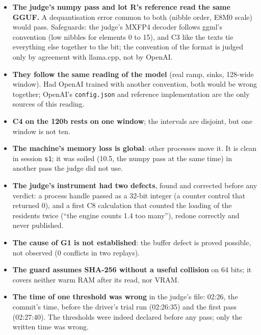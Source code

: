 \begin{faux}\label{t2e-sec:faux}
\begin{itemize}
\item \textbf{The judge's numpy pass and lot R's reference read the same GGUF.} A dequantisation error common to both (nibble order, E8M0 scale) would pass. Safeguards: the judge's MXFP4 decoder follows ggml's convention (low nibbles for elements 0 to 15), and C3 like the texts tie everything else together to the bit; the convention of the format is judged only by agreement with llama.cpp, not by OpenAI.
\item \textbf{They follow the same reading of the model} (real ramp, sinks, 128-wide window). Had OpenAI trained with another convention, both would be wrong together; OpenAI's \texttt{config.json} and reference implementation are the only sources of this reading.
\item \textbf{C4 on the 120b rests on one window}; the intervals are disjoint, but one window is not ten.
\item \textbf{The machine's memory loss is global}: other processes move it. It is clean in session \texttt{s1}; it was soiled (\SI{10.5}{\Go}, the numpy pass at the same time) in another pass the judge did not use.
\item \textbf{The judge's instrument had two defects}, found and corrected before any verdict: a process handle passed as a 32-bit integer (a counter control that returned 0), and a first C8 calculation that counted the loading of the residents twice (``the engine counts \SI{1.4}{\Go} too many''), redone correctly and never published.
\item \textbf{The cause of G1 is not established}: the buffer defect is proved possible, not observed (0 conflicts in two replays).
\item \textbf{The guard assumes SHA-256 without a useful collision} on 64 bits; it covers neither warm RAM after its read, nor VRAM.
\item \textbf{The time of one threshold was wrong} in the judge's file:  02:26, the commit's time, before the driver's trial run (02:26:35) and the first pass (02:27:40). The thresholds were indeed declared before any pass; only the written time was wrong.
\end{itemize}
\end{faux}
